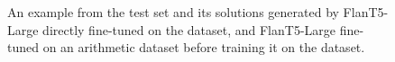 \begin{figure}
    \centering
    
    \caption{An example from the \gsm{} test set and its solutions generated by \figtop{} FlanT5-Large directly fine-tuned on the \gsm{} dataset, and \figbottom{} FlanT5-Large fine-tuned on an arithmetic dataset before training it on the \gsm{} dataset.}
    \label{fig:arith_error_example}
\end{figure}